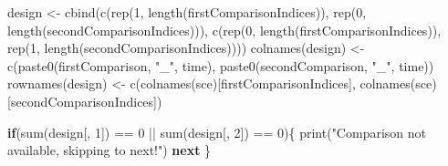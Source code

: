 \documentclass[
]{article}
\newenvironment{Shaded}{\begin{snugshade}}{\end{snugshade}}
\newcommand{\ControlFlowTok}[1]{\textcolor[rgb]{0.13,0.29,0.53}{\textbf{#1}}}
\newcommand{\DecValTok}[1]{\textcolor[rgb]{0.00,0.00,0.81}{#1}}
\newcommand{\FunctionTok}[1]{\textcolor[rgb]{0.00,0.00,0.00}{#1}}
\newcommand{\NormalTok}[1]{#1}
\newcommand{\OtherTok}[1]{\textcolor[rgb]{0.56,0.35,0.01}{#1}}
\newcommand{\SpecialCharTok}[1]{\textcolor[rgb]{0.00,0.00,0.00}{#1}}
\newcommand{\StringTok}[1]{\textcolor[rgb]{0.31,0.60,0.02}{#1}}
\begin{document}
\begin{Shaded}
\begin{Highlighting}[]
\NormalTok{    design }\OtherTok{\textless{}{-}} \FunctionTok{cbind}\NormalTok{(}\FunctionTok{c}\NormalTok{(}\FunctionTok{rep}\NormalTok{(}\DecValTok{1}\NormalTok{, }\FunctionTok{length}\NormalTok{(firstComparisonIndices)), }\FunctionTok{rep}\NormalTok{(}\DecValTok{0}\NormalTok{, }\FunctionTok{length}\NormalTok{(secondComparisonIndices))), }\FunctionTok{c}\NormalTok{(}\FunctionTok{rep}\NormalTok{(}\DecValTok{0}\NormalTok{, }\FunctionTok{length}\NormalTok{(firstComparisonIndices)), }\FunctionTok{rep}\NormalTok{(}\DecValTok{1}\NormalTok{, }\FunctionTok{length}\NormalTok{(secondComparisonIndices))))}
    \FunctionTok{colnames}\NormalTok{(design) }\OtherTok{\textless{}{-}} \FunctionTok{c}\NormalTok{(}\FunctionTok{paste0}\NormalTok{(firstComparison, }\StringTok{"\_"}\NormalTok{, time), }\FunctionTok{paste0}\NormalTok{(secondComparison, }\StringTok{"\_"}\NormalTok{, time))}
    \FunctionTok{rownames}\NormalTok{(design) }\OtherTok{\textless{}{-}} \FunctionTok{c}\NormalTok{(}\FunctionTok{colnames}\NormalTok{(sce)[firstComparisonIndices], }\FunctionTok{colnames}\NormalTok{(sce)[secondComparisonIndices])}
    
    \ControlFlowTok{if}\NormalTok{(}\FunctionTok{sum}\NormalTok{(design[, }\DecValTok{1}\NormalTok{]) }\SpecialCharTok{==} \DecValTok{0} \SpecialCharTok{||} \FunctionTok{sum}\NormalTok{(design[, }\DecValTok{2}\NormalTok{]) }\SpecialCharTok{==} \DecValTok{0}\NormalTok{)\{}
      \FunctionTok{print}\NormalTok{(}\StringTok{"Comparison not available, skipping to next!"}\NormalTok{)}
      \ControlFlowTok{next}
\NormalTok{    \}}
    

\end{Highlighting}
\end{Shaded}
\end{document}
